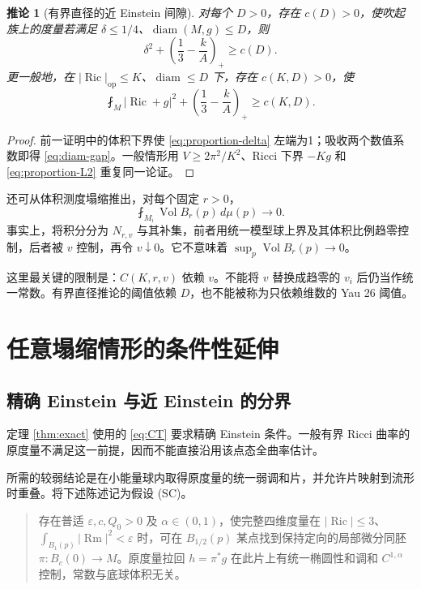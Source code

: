 \documentclass[UTF8,fontset=fandol,zihao=-4]{ctexart}
\theoremstyle{cn}
\newtheorem{corollary}[theorem]{推论}
\DeclareMathOperator{\Ric}{Ric}
\DeclareMathOperator{\Rm}{Rm}
\DeclareMathOperator{\Vol}{Vol}
\DeclareMathOperator{\diam}{diam}
\newcommand{\op}{\mathrm{op}}
\newcommand{\dd}{\,d\mu}
\newcommand{\av}{\fint}
\numberwithin{equation}{section}
\begin{document}
\begin{corollary}[有界直径的近 Einstein 间隙]\label{cor:diam}
对每个 $D>0$，存在 $c(D)>0$，使吹起族上的度量若满足 $\delta\le1/4$、$\diam(M,g)\le D$，则
\begin{equation}\label{eq:diam-gap}
\delta^2+\left(\frac13-\frac{k}{A}\right)_+\ge c(D).
\end{equation}
更一般地，在 $|\Ric|_{\op}\le K$、$\diam\le D$ 下，存在 $c(K,D)>0$，使
\begin{equation}\label{eq:diam-L2}
\av_M|\Ric+g|^2+\left(\frac13-\frac{k}{A}\right)_+\ge c(K,D).
\end{equation}
\end{corollary}
\begin{proof}
前一证明中的体积下界使 \eqref{eq:proportion-delta} 左端为1；吸收两个数值系数即得 \eqref{eq:diam-gap}。一般情形用 $V\ge2\pi^2/K^2$、Ricci 下界 $-Kg$ 和 \eqref{eq:proportion-L2} 重复同一论证。
\end{proof}

还可从体积测度塌缩推出，对每个固定 $r>0$，
\begin{equation}\label{eq:mean-ball}
\av_{M_i}\Vol B_r(p)\dd(p)\longrightarrow0.
\end{equation}
事实上，将积分分为 $N_{r,v}$ 与其补集，前者用统一模型球上界及其体积比例趋零控制，后者被 $v$ 控制，再令 $v\downarrow0$。它不意味着 $\sup_p\Vol B_r(p)\to0$。

这里最关键的限制是：$C(K,r,v)$ 依赖 $v$。不能将 $v$ 替换成趋零的 $v_i$ 后仍当作统一常数。有界直径推论的阈值依赖 $D$，也不能被称为只依赖维数的 Yau 26 阈值。

\section{任意塌缩情形的条件性延伸}

\subsection{精确 Einstein 与近 Einstein 的分界}

定理 \ref{thm:exact} 使用的 \eqref{eq:CT} 要求精确 Einstein 条件。一般有界 Ricci 曲率的原度量不满足这一前提，因而不能直接沿用该点态全曲率估计。

所需的较弱结论是在小能量球内取得原度量的统一弱调和片，并允许片映射到流形时重叠。将下述陈述记为假设 (SC)。

\begin{quote}
存在普适 $\varepsilon,c,Q_0>0$ 及 $\alpha\in(0,1)$，使完整四维度量在 $|\Ric|\le3$、$\int_{B_1(p)}|\Rm|^2<\varepsilon$ 时，可在 $B_{1/2}(p)$ 某点找到保持定向的局部微分同胚 $\pi:B_c(0)\to M$。原度量拉回 $h=\pi^*g$ 在此片上有统一椭圆性和调和 $C^{1,\alpha}$ 控制，常数与底球体积无关。
\end{quote}
\end{document}
